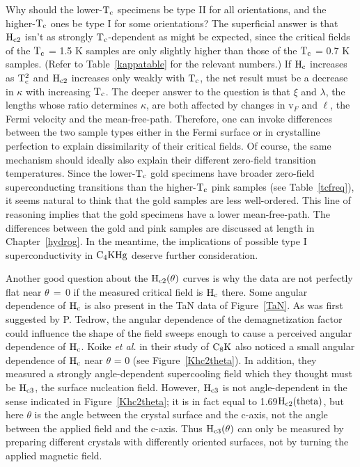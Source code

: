         Why   should  the lower-$\rm T_c$  specimens   be  type  II for all
orientations,   and  the  higher-$\rm  T_c$ ones    be   type   I  for some
orientations?   The   superficial answer  is  that  $\rm H_{c2}$  isn't  as
strongly   $\rm T_c$-dependent as might  be  expected, since  the  critical
fields of the $\rm T_c$ = 1.5 K samples are only slightly higher than those
of the $\rm T_c$ = 0.7 K samples.  (Refer to Table~\ref{kappatable} for the
relevant numbers.)  If $\rm H_c$ increases as $\rm T_c^2$  and $\rm H_{c2}$
increases only weakly with $\rm T_c$, the net result  must be a decrease in
$\kappa$ with increasing  $\rm T_c$.  The  deeper answer to the question is
that $\xi$ and $\lambda$, the lengths whose ratio determines  $\kappa$, are
both affected by changes in v$_F$ and  $\ell$,  the  Fermi velocity and the
mean-free-path.\cite{orlando79}   Therefore,   one  can invoke  differences
between the two sample types either in the Fermi  surface or in crystalline
perfection to  explain dissimilarity   of their   critical fields.   Of
course,  the same  mechanism should  ideally  also explain  their different
zero-field   transition  temperatures.  Since   the  lower-$\rm T_c$   gold
specimens  have  broader zero-field superconducting  transitions   than the
higher-$\rm T_c$ pink samples (see Table~\ref{tcfreq}), it seems natural to
think that the gold samples are  less well-ordered.  This line of reasoning
implies  that the   gold   specimens  have  a  lower  mean-free-path.   The
differences between the gold and  pink samples are  discussed  at length in
Chapter~\ref{hydrog}.  In the meantime, the implications of possible type I
superconductivity in $\rm C_4KHg$ deserve further consideration.

        Another good question about the $\rm  H_{c2}(\theta)$ curves is why
the  data are not perfectly flat  near  $\theta \,  = \, 0$ if the measured
critical field is $\rm H_c$ there.  Some angular  dependence of $\rm H_{c}$
is also present  in  the   TaN  data of Figure~\ref{TaN}.    As  was  first
suggested by   P.  Tedrow\cite{tedrow88}, the  angular  dependence  of  the
demagnetization factor could influence the shape of the field sweeps enough
to  cause a perceived   angular dependence  of  $\rm H_c$.   	Koike {\em et
al.}\cite{koike80} in their   study of $\rm   C_8K$  also noticed  a  small
angular  dependence   of    $\rm  H_c$     near     $\theta$ =    0    (see
Figure~\ref{Khc2theta}).  In addition,      they  measured   a     strongly
angle-dependent supercooling field which they thought must be $\rm H_{c3}$,
the  surface nucleation  field.     However, $\rm H_{c3}$ is not
angle-dependent in the sense indicated in Figure~\ref{Khc2theta}; it is
in fact equal to 1.69$\rm H_{c2}(theta)$, but here $\theta$ is the angle
between the crystal surface and the c-axis, not the angle between the
applied field and the c-axis.\cite{orlando88}  Thus $\rm H_{c3}(\theta)$
can only be measured by preparing different crystals with differently
oriented surfaces, not by turning the applied magnetic field.

